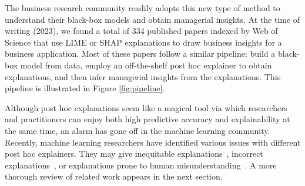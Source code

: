 \documentclass[11pt]{article}    %
\begin{document}

The business research community readily adopts this new type of method to understand their black-box models and obtain managerial insights. At the time of writing (2023), we found a total of 334 published papers indexed by Web of Science that use LIME or SHAP explanations to draw business insights for a business application. Most of these papers follow a similar pipeline: build a black-box model from data, employ an off-the-shelf post hoc explainer to obtain explanations, and then infer managerial insights from the explanations.  This pipeline is illustrated in Figure \ref{fig:pipeline}.


Although post hoc explanations seem like a magical tool via which researchers and practitioners can enjoy both high predictive accuracy and explainability at the same time, an alarm has gone off in the machine learning community. Recently, machine learning researchers have identified various issues with different post hoc explainers. They may give inequitable explanations~\citep{alvarez18robustness}, incorrect explanations~\citep{garreau20theoretical}, or explanations prone to human misunderstanding~\citep{kumar20shap}. A more thorough review of related work appears in the next section. %

\end{document}
